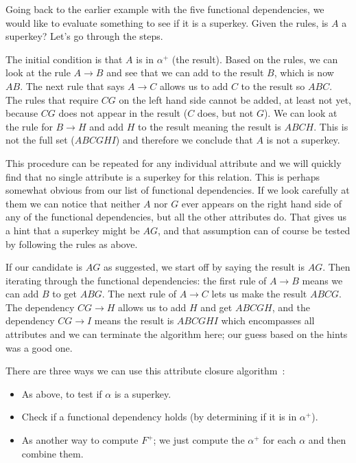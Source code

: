 \documentclass[a4paper]{report}
\begin{document}
Going back to the earlier example with the five functional dependencies, we would like to evaluate something to see if it is a superkey. Given the rules, is $A$ a superkey? Let's go through the steps. 

The initial condition is that $A$ is in $\alpha^{+}$ (the result). Based on the rules, we can look at the rule $A \rightarrow B$ and see that we can add to the result $B$, which is now $AB$. The next rule that says $A \rightarrow C$ allows us to add $C$ to the result so $ABC$. The rules that require $CG$ on the left hand side cannot be added, at least not yet, because $CG$ does not appear in the result ($C$ does, but not $G$). We can look at the rule for $B \rightarrow H$ and add $H$ to the result meaning the result is $ABCH$. This is not the full set ($ABCGHI$) and therefore we conclude that $A$ is not a superkey.

This procedure can be repeated for any individual attribute and we will quickly find that no single attribute is a superkey for this relation. This is perhaps somewhat obvious from our list of functional dependencies. If we look carefully at them we can notice that neither $A$ nor $G$ ever appears on the right hand side of any of the functional dependencies, but all the other attributes do. That gives us a hint that a superkey might be $AG$, and that assumption can of course be tested by following the rules as above.

If our candidate is $AG$ as suggested, we start off by saying the result is $AG$. Then  iterating through the functional dependencies: the first rule of $A \rightarrow B$ means we can add $B$ to get $ABG$. The next rule of $A \rightarrow C$ lets us make the result $ABCG$. The dependency $CG \rightarrow H$ allows us to add $H$ and get $ABCGH$, and the dependency $CG \rightarrow I$ means the result is $ABCGHI$ which encompasses all attributes and we can terminate the algorithm here; our guess based on the hints was a good one.

There are three ways we can use this attribute closure algorithm~\cite{dsc}:
\begin{itemize}
	\item As above, to test if $\alpha$ is a superkey.
	\item Check if a functional dependency holds (by determining if it is in $\alpha^{+}$).
	\item As another way to compute $F^{+}$; we just compute the $\alpha^{+}$ for each $\alpha$ and then combine them. 
\end{itemize}
\end{document}
